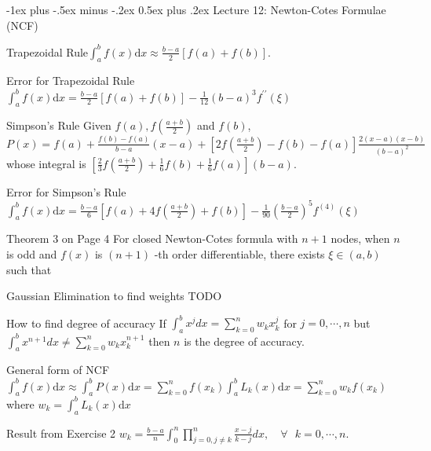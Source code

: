 \documentclass[10pt,landscape]{article}
\makeatletter
\renewcommand{\section}{\@startsection{section}{1}{0mm}%
                                {-1ex plus -.5ex minus -.2ex}%
                                {0.5ex plus .2ex}%
                                {\normalfont\large\bfseries}}
\theoremstyle{definition}
\newcommand{\thistheoremname}{}
\newtheorem*{genericthm*}{\thistheoremname}
\newenvironment{namedthm*}[1]
{\renewcommand{\thistheoremname}{#1}\begin{genericthm*}}
{\end{genericthm*}}
\makeatother
\begin{document}
\begin{multicols}{3}
	\section{Lecture 12: Newton-Cotes Formulae (NCF)}
	\begin{namedthm*}{Trapezoidal Rule}\(\int_{a}^{b} f(x) \mathrm{d} x \approx \frac{b-a}{2}[f(a)+f(b)]\).
	\end{namedthm*}
	\begin{namedthm*}{Error for Trapezoidal Rule}\(\int_{a}^{b} f(x) \mathrm{d} x=\frac{b-a}{2}[f(a)+f(b)]-\frac{1}{12}(b-a)^{3} f^{\prime \prime}(\xi)\)
	\end{namedthm*}
	\begin{namedthm*}{Simpson's Rule} Given \(f(a), f\left(\frac{a+b}{2}\right)\) and \(f(b)\), \(P(x)=f(a)+\frac{f(b)-f(a)}{b-a}(x-a)+\left[2 f\left(\frac{a+b}{2}\right)-f(b)-f(a)\right] \frac{2(x-a)(x-b)}{(b-a)^{2}}\) whose integral is \(\left[\frac{2}{3} f\left(\frac{a+b}{2}\right)+\frac{1}{6} f(b)+\frac{1}{6} f(a)\right](b-a)\).
	\end{namedthm*}
	\begin{namedthm*}{Error for Simpson's Rule}\(\int_{a}^{b} f(x) \mathrm{d} x=\frac{b-a}{6}\left[f(a)+4 f\left(\frac{a+b}{2}\right)+f(b)\right]-\frac{1}{90}\left(\frac{b-a}{2}\right)^{5} f^{(4)}(\xi)\)
	\end{namedthm*}
	\begin{namedthm*}{Theorem 3 on Page 4}
		For closed Newton-Cotes formula with \(n+1\) nodes, when \(n\) is odd and \(f(x)\) is
\((n+1)\) -th order differentiable, there exists \(\xi \in(a, b)\) such that
	\end{namedthm*}
	\begin{namedthm*}{Gaussian Elimination to find weights}
		\color{red}TODO
	\end{namedthm*}
	\begin{namedthm*}{How to find degree of accuracy}
		If \(\int_a^bx^jdx = \sum_{k=0}^nw_kx_k^j\) for \(j = 0,\cdots,n\) but \(\int_a^bx^{n+1}dx \neq \sum_{k=0}^nw_kx_k^{n+1}\) then \(n\) is the degree of accuracy.
	\end{namedthm*}
	\begin{namedthm*}{General form of NCF}
		\(\int_{a}^{b} f(x) \mathrm{d} x \approx \int_{a}^{b} P(x) \mathrm{d} x=\sum_{k=0}^{n} f\left(x_{k}\right) \int_{a}^{b} L_{k}(x) \mathrm{d} x=\sum_{k=0}^{n} w_{k} f\left(x_{k}\right)\) where \(w_{k}=\int_{a}^{b} L_{k}(x) \mathrm{d} x\)
	\end{namedthm*}
	\begin{namedthm*}{Result from Exercise 2}
		\(w_k=\frac{b-a}{n}\int_0^n\prod_{j=0,j\neq k}^{n}\frac{x-j}{k-j}dx, \quad \forall \text{ } k = 0,\cdots,n.\)
	\end{namedthm*}

\end{multicols}
\end{document}
